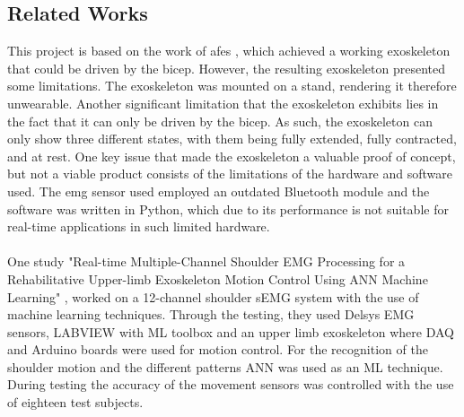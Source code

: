 \subsection{Related Works}
This project is based on the work of \acrfull{afes} \cite{AFES}, which achieved a working exoskeleton that could be driven by the bicep. However, the resulting 
exoskeleton presented some limitations. The exoskeleton was mounted on a stand, rendering it therefore unwearable. Another significant limitation 
that the exoskeleton exhibits lies in the fact that it can only be driven by the bicep. As such, the exoskeleton can only show three different states, 
with them being fully extended, fully contracted, and at rest. One key issue that made the exoskeleton a valuable proof of concept, but not a viable 
product consists of the limitations of the hardware and software used. The \acrshort{emg} sensor used employed an outdated Bluetooth module and the software was 
written in Python, which due to its performance is not suitable for real-time applications in such limited hardware. 
\\\\
One study "Real-time Multiple-Channel Shoulder EMG Processing for a Rehabilitative Upper-limb Exoskeleton Motion Control Using ANN Machine Learning" \cite{shoulderexo},
worked on a 12-channel shoulder sEMG system with the use of machine learning techniques. Through the testing, they used Delsys EMG sensors, LABVIEW with ML toolbox and an 
upper limb exoskeleton where DAQ and Arduino boards were used for motion control. For the recognition of the shoulder motion and the different patterns ANN was used as an 
ML technique. During testing the accuracy of the movement sensors was controlled with the use of eighteen test subjects.
